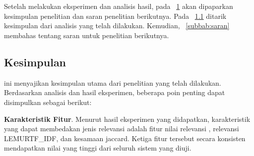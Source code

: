 \chapter{\babEnam}
\label{bab:6}
Setelah melakukan eksperimen dan analisis hasil, pada \bab{}~\ref{bab:6} akan dipaparkan kesimpulan penelitian dan saran penelitian berikutnya. Pada \subbab{}~\ref{subbab:kesimpulan} ditarik kesimpulan dari analisis yang telah dilakukan. Kemudian, \subbab{}~\ref{subbab:saran} membahas tentang saran untuk penelitian berikutnya.





\section{Kesimpulan}
\label{subbab:kesimpulan}
\subbab{} ini menyajikan kesimpulan utama dari penelitian yang telah dilakukan. Berdasarkan analisis dan hasil eksperimen, beberapa poin penting dapat disimpulkan sebagai berikut:

\vspace{2mm}
\noindent\textbf{Karakteristik Fitur}. Menurut hasil eksperimen yang didapatkan, karakteristik yang dapat membedakan jenis relevansi adalah fitur nilai relevansi \obm{}, relevansi LEMURTF\_IDF, dan kesamaan jaccard. Ketiga fitur tersebut secara konsisten mendapatkan nilai \feature{} \importance{} yang tinggi dari seluruh sistem yang diuji.

